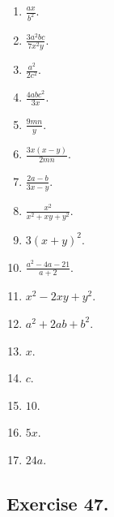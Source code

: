 \documentclass{book}
\begin{document}
\begin{enumerate}
\item $\displaystyle \frac{ax}{b^2}$. \item $\displaystyle
\frac{3a^2 bc}{7x^2 y}$. \item $\displaystyle \frac{a^2}{2c^2}$.
\item $\displaystyle \frac{4abc^2}{3x}$. \item $\displaystyle
\frac{9mn}{y}$. \item $\displaystyle \frac{3x(x-y)}{2mn}$. \item
$\displaystyle \frac{2a-b}{3x-y}$. \item $\displaystyle
\frac{x^2}{x^2+xy+y^2}$. \item $3\left(x+y\right)^2$. \item
$\displaystyle \frac{a^2-4a-21}{a+2}$. \item $x^2-2xy+y^2$. \item
$a^2+2ab+b^2$. \item $x$. \item $c$. \item $10$. \item $5x$. \item
$24a$.
\end{enumerate}

\subsection*{Exercise 47.}
\end{document}
